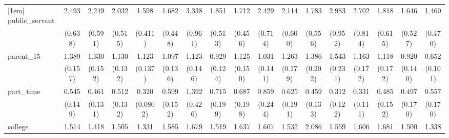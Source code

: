 {\begin{tabular}{l*{16}{c}}
[1em]
public\_servant      &       2.493\sym{***}&       2.249\sym{**} &       2.032\sym{**} &       1.598         &       1.682         &       3.338\sym{***}&       1.851\sym{*}  &       1.712\sym{*}  &       2.429\sym{**} &       2.114\sym{**} &       1.783         &       2.983\sym{***}&       2.702\sym{***}&       1.818         &       1.646         &       1.460         \\
                    &     (0.638)         &     (0.591)         &     (0.515)         &     (0.411)         &     (0.448)         &     (0.961)         &     (0.513)         &     (0.456)         &     (0.714)         &     (0.600)         &     (0.556)         &     (0.952)         &     (0.814)         &     (0.615)         &     (0.527)         &     (0.470)         \\
[1em]
parent\_15           &       1.389\sym{**} &       1.330\sym{*}  &       1.130         &       1.123         &       1.097         &       1.123         &       0.929         &       1.125         &       1.031         &       1.263         &       1.386\sym{*}  &       1.543\sym{**} &       1.163         &       1.118         &       0.920         &       0.652\sym{**} \\
                    &     (0.157)         &     (0.152)         &     (0.132)         &     (0.137)         &     (0.136)         &     (0.146)         &     (0.124)         &     (0.150)         &     (0.141)         &     (0.179)         &     (0.202)         &     (0.231)         &     (0.172)         &     (0.172)         &     (0.140)         &     (0.101)         \\
[1em]
part\_time           &       0.545\sym{*}  &       0.461\sym{**} &       0.512\sym{**} &       0.320\sym{***}&       0.599\sym{*}  &       1.392         &       0.715         &       0.687         &       0.859         &       0.625         &       0.459\sym{**} &       0.312\sym{**} &       0.331\sym{***}&       0.485\sym{*}  &       0.497\sym{*}  &       0.557         \\
                    &     (0.149)         &     (0.131)         &     (0.132)         &    (0.0802)         &     (0.152)         &     (0.426)         &     (0.199)         &     (0.198)         &     (0.244)         &     (0.191)         &     (0.133)         &     (0.122)         &     (0.111)         &     (0.152)         &     (0.170)         &     (0.170)         \\
[1em]
college             &       1.514\sym{**} &       1.418\sym{**} &       1.505\sym{**} &       1.331\sym{*}  &       1.585\sym{**} &       1.679\sym{***}&       1.519\sym{**} &       1.637\sym{**} &       1.607\sym{**} &       1.532\sym{*}  &       2.086\sym{***}&       1.559\sym{*}  &       1.606\sym{**} &       1.681\sym{**} &       1.500\sym{*}  &       1.338         \\

\end{tabular}}
